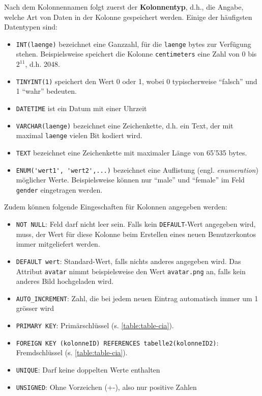 Nach dem Kolonnennamen folgt zuerst der \textbf{Kolonnentyp}, d.h., die Angabe, welche Art von Daten in der Kolonne gespeichert werden. Einige der häufigsten Datentypen sind:
\begin{itemize}
  \item \lstinline|INT(laenge)| bezeichnet eine Ganzzahl, für die \texttt{laenge} bytes zur Verfügung stehen. Beispielsweise speichert die Kolonne \texttt{centimeters} eine Zahl von 0 bis $2^{11}$, d.h. 2048.
  \item \lstinline|TINYINT(1)| speichert den Wert 0 oder 1, wobei 0 typischerweise ``falsch'' und 1 ``wahr'' bedeuten.
  \item \lstinline|DATETIME| ist ein Datum mit einer Uhrzeit
  \item \lstinline|VARCHAR(laenge)| bezeichnet eine Zeichenkette, d.h. ein Text, der mit maximal \texttt{laenge} vielen Bit kodiert wird.
  \item \lstinline|TEXT| bezeichnet eine Zeichenkette mit maximaler Länge von 65'535 bytes.
  \item \lstinline|ENUM('wert1', 'wert2',...)| bezeichnet eine Auflistung (engl. \textit{enumeration}) möglicher Werte. Beispielsweise können nur ``male'' und ``female'' im Feld \texttt{gender} eingetragen werden.
\end{itemize}

Zudem können folgende Eingeschaften für Kolonnen angegeben werden:

\begin{itemize}
  \item \lstinline|NOT NULL|: Feld darf nicht leer sein. Falls kein \lstinline|DEFAULT|-Wert angegeben wird, muss, der Wert für diese Kolonne beim Erstellen eines neuen Benutzerkontos immer mitgeliefert werden.
  \item \lstinline|DEFAULT wert|: Standard-Wert, falls nichts anderes angegeben wird. Das Attribut \texttt{avatar} nimmt beispielsweise den Wert \texttt{avatar.png} an, falls kein anderes Bild hochgeladen wird.
  \item \lstinline|AUTO_INCREMENT|: Zahl, die bei jedem neuen Eintrag automatisch immer um 1 grösser wird
  \item \lstinline|PRIMARY KEY|: Primärschlüssel (s. \cref{table:table-cia}).
  \item \lstinline|FOREIGN KEY (kolonneID) REFERENCES tabelle2(kolonneID2)|: Fremdschlüssel (s. \cref{table:table-cia}).
  \item \lstinline|UNIQUE|: Darf keine doppelten Werte enthalten
  \item \lstinline|UNSIGNED|: Ohne Vorzeichen (+-), also nur positive Zahlen
\end{itemize}

